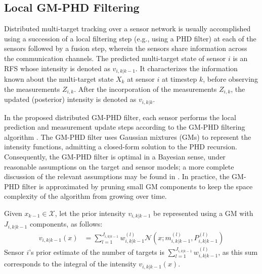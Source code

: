 \subsection{Local GM-PHD Filtering}
\label{sec:subsec_local_filt}
Distributed multi-target tracking over a sensor network is usually accomplished using a succession of a local filtering step (e.g., using a PHD filter) at each of the sensors followed by a fusion step, wherein the sensors share information across the communication channels. 
The predicted multi-target state of sensor $i$ is an RFS whose intensity is denoted as $v_{i,k|k-1}$. It characterizes the information known about the multi-target state $X_k$ at sensor $i$ at timestep $k$, before observing the measurements $Z_{i,k}$. After the incorporation of the measurements $Z_{i,k}$, the updated (posterior) intensity is denoted as $v_{i,k|k}$. 

In the proposed distributed GM-PHD filter, each sensor performs the local prediction and measurement update steps according to the GM-PHD filtering algorithm \cite{vo2006gmphd}. The GM-PHD filter uses Gaussian mixtures (GMs) to represent the intensity functions, admitting a closed-form solution to the PHD recursion. Consequently, the GM-PHD filter is optimal in a Bayesian sense, under reasonable assumptions on the target and sensor models; a more complete discussion of the relevant assumptions may be found in \cite{vo2006gmphd}. In practice, the GM-PHD filter is approximated by pruning small GM components to keep the space complexity of the algorithm from growing over time.

Given $x_{k-1} \in \mathcal X$, let the prior intensity $v_{i,k|k-1}$
be represented using a GM with $J_{i,k|k-1}$ components, as follows:
\begin{align}
    v_{i,k|k-1}(x) &= \sum_{l=1}^{J_{i,k|k-1}}w^{(l)}_{i,k|k-1}\mathcal N(x;m^{(l)}_{i,k|k-1}, P^{(l)}_{i,k|k-1})
    \label{eq:prior_intensity}
\end{align}
Sensor $i$'s prior estimate of the number of targets is $\sum_{l=1}^{J_{i,k|k-1}} w_{i,k|k-1}^{(l)}$, as this sum corresponds to the integral of the intensity $v_{i,k|k-1}(x)$.

